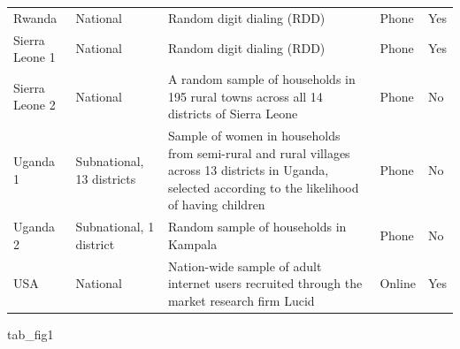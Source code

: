 \documentclass[
  12pt,
]{article}
\newenvironment{Shaded}{\begin{snugshade}}{\end{snugshade}}
\newcommand{\NormalTok}[1]{#1}
\begin{document}
\begin{landscape}
\begin{table}[!h]
{\begin{tabular}[t]{>{\raggedright\arraybackslash}p{8em}>{\raggedright\arraybackslash}p{12em}>{\raggedright\arraybackslash}p{30em}ll}
Rwanda & National & Random digit dialing (RDD) & Phone & Yes\\
Sierra Leone 1 & National & Random digit dialing (RDD) & Phone & Yes\\
Sierra Leone 2 & National & A random sample of households in 195 rural towns across all 14 districts of Sierra Leone & Phone & No\\
Uganda 1 & Subnational, 13 districts & Sample of women in households from semi-rural and rural villages across 13 districts in Uganda, selected according to the likelihood of having children & Phone & No\\
Uganda 2 & Subnational, 1 district & Random sample of households in Kampala & Phone & No\\
USA & National & Nation-wide sample of adult internet users recruited through the market research firm Lucid & Online & Yes\\
\bottomrule
\end{tabular}}
\end{table}
\end{landscape}

\begin{Shaded}
\begin{Highlighting}[]
\NormalTok{tab\_fig1}
\end{Highlighting}
\end{Shaded}
\end{document}
